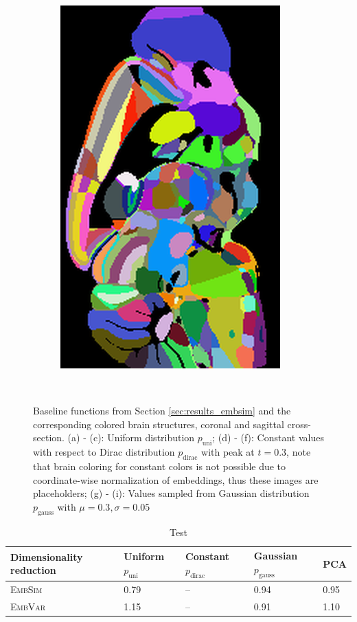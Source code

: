\documentclass[]{article}
\begin{document}
\begin{figure}
\begin{subfigure}{0.3\textwidth}
		\includegraphics[width=.67\linewidth, angle=270]{../results/random_noise__ano_sagittal_50_res_slice_1.png}
		\caption{}
	\end{subfigure}\\
	\caption{Baseline functions from Section \ref{sec:results_embsim} and the corresponding colored brain structures, coronal and sagittal cross-section. (a) - (c): Uniform distribution $p_\text{uni}$; (d) - (f): Constant values with respect to Dirac distribution $p_\text{dirac}$ with peak at $t=0.3$, note that brain coloring for constant colors is not possible due to coordinate-wise normalization of embeddings, thus these images are placeholders; (g) - (i): Values sampled from Gaussian distribution $p_\text{gauss}$ with $\mu=0.3, \sigma=0.05$}
	\label{fig:baseline_distributions}
\end{figure}

\begin{table}
	\centering
	\renewcommand{\arraystretch}{1.5}
	\begin{tabular}{|l|llll|}
		\hline
		Dimensionality reduction&Uniform $p_\text{uni}$ &Constant $p_\text{dirac}$&Gaussian $p_\text{gauss}$&PCA\\
		\hline
		\textsc{EmbSim}&0.79& -- & 0.94&0.95\\
		\textsc{EmbVar}&1.15& -- & 0.91 & 1.10\\ 
		\hline
		
	\end{tabular}
	\label{tab:dim_red_results}
	\caption{Test}
\end{table}
\end{document}

